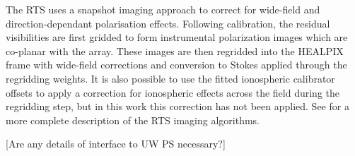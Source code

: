 The RTS uses a snapshot imaging approach to correct for wide-field and direction-dependant polarisation effects. Following calibration, the residual visibilities are first gridded to form instrumental polarization images which are co-planar with the array. These images are then regridded into the HEALPIX frame with wide-field corrections and conversion to Stokes applied through the regridding weights. It is also possible to use the fitted ionospheric calibrator offsets to apply a correction for ionospheric effects across the field during the regridding step, but in this work this correction has not been applied. See \citet{Clark_Allen_Arcus_et_al__2010} for a more complete description of the RTS imaging algorithms.

[Are any details of interface to UW PS necessary?]